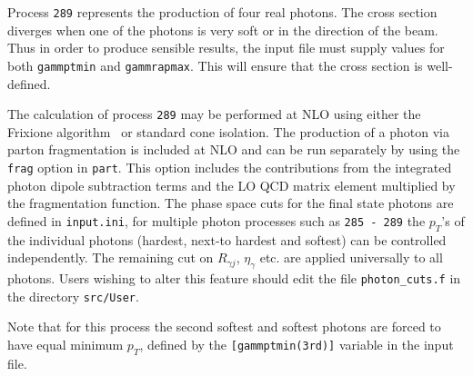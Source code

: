 \label{subsec:fourgam}

Process {\tt 289} represents the production of four real photons.
The cross section diverges
when one of the photons is very soft or in the direction of the beam.
Thus in order to produce sensible results, the input file must supply values for both
{\tt gammptmin} and {\tt gammrapmax}. This will ensure that
the cross section is well-defined.

The calculation of process {\tt 289} may be performed at NLO using either the
Frixione algorithm~\cite{Frixione:1998jh} or standard cone isolation.  The production of a photon via parton
fragmentation is included at NLO and
can be run separately by using the {\tt frag} option in {\tt part}. This option includes the contributions from the
integrated
photon dipole subtraction terms and the LO QCD matrix element multiplied by the fragmentation function.
The phase space cuts for the final state photons are defined in {\tt{input.ini}}, for multiple photon processes such
as {\tt 285 - 289} the $p_T$'s of the individual photons (hardest, next-to hardest and softest) can be controlled
independently.
The remaining cut on $R_{\gamma j}$, $\eta_{\gamma}$ etc. are applied universally to all photons. Users wishing to alter
this feature should edit the file {\tt{photon\_cuts.f}} in the directory {\tt{src/User}}.

Note that for this process the second softest and softest photons are forced to have equal minimum $p_T$, defined
by the {\tt{[gammptmin(3rd)]}} variable in the input file.
